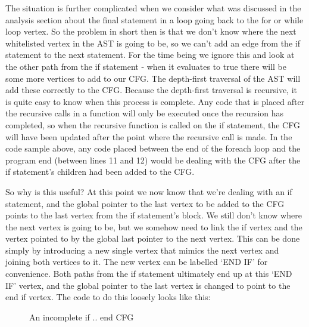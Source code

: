 The situation is further complicated when we consider what was discussed in the analysis section about the final statement in a loop going back to the for or while loop vertex. So the problem in short then is that we don't know where the next whitelisted vertex in the AST is going to be, so we can't add an edge from the if statement to the next statement. For the time being we ignore this and look at the other path from the if statement - when it evaluates to true there will be some more vertices to add to our CFG. The depth-first traversal of the AST will add these correctly to the CFG. Because the depth-first traversal is recursive, it is quite easy to know when this process is complete. Any code that is placed after the recursive calls in a function will only be executed once the recursion has completed, so when the recursive function is called on the if statement, the CFG will have been updated after the point where the recursive call is made. In the code sample above, any code placed between the end of the foreach loop and the program end (between lines 11 and 12) would be dealing with the CFG after the if statement's children had been added to the CFG.

So why is this useful? At this point we now know that we're dealing with an if statement, and the global pointer to the last vertex to be added to the CFG points to the last vertex from the if statement's block. We still don't know where the next vertex is going to be, but we somehow need to link the if vertex and the vertex pointed to by the global last pointer to the next vertex. This can be done simply by introducing a new single vertex that mimics the next vertex and joining both vertices to it. The new vertex can be labelled `END IF' for convenience. Both paths from the if statement ultimately end up at this `END IF' vertex, and the global pointer to the last vertex is changed to point to the end if vertex. The code to do this loosely looks like this:

\begin{figure}
\centering
\begin{minipage}{.6\textwidth}
  \centering
  	
\end{minipage}%
\begin{minipage}{.4\textwidth}
  \centering
  \caption{An incomplete if .. end CFG}
  \label{fig:ifElseNoEnd}
\end{minipage}
\end{figure}




